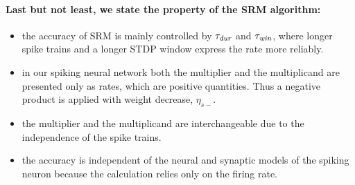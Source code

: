 
\paragraph{Last but not least, we state the property of the SRM algorithm:}
\begin{itemize}
	\item the accuracy of SRM is mainly controlled by $\tau_{\textit{\textrm{dur}}}$ and $\tau_{\textit{\textrm{win}}}$, where longer spike trains and a longer STDP window express the rate more reliably.
	\item in our spiking neural network both the multiplier and the multiplicand are presented only as rates, which are positive quantities.
	Thus a negative product is applied with weight decrease, $\eta_{s-}$. 
	\item the multiplier and the multiplicand are interchangeable due to the independence of the spike trains. 
	\item the accuracy is independent of the neural and synaptic models of the spiking neuron because the calculation relies only on the firing rate.
\end{itemize}


